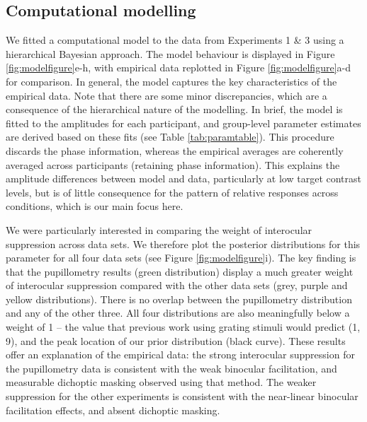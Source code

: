 \documentclass[
]{article}
\begin{document}
\hypertarget{computational-modelling}{%
\subsection{Computational modelling}\label{computational-modelling}}

We fitted a computational model to the data from Experiments 1 \& 3 using a hierarchical Bayesian approach. The model behaviour is displayed in Figure \ref{fig:modelfigure}e-h, with empirical data replotted in Figure \ref{fig:modelfigure}a-d for comparison. In general, the model captures the key characteristics of the empirical data. Note that there are some minor discrepancies, which are a consequence of the hierarchical nature of the modelling. In brief, the model is fitted to the amplitudes for each participant, and group-level parameter estimates are derived based on these fits (see Table \ref{tab:paramtable}). This procedure discards the phase information, whereas the empirical averages are coherently averaged across participants (retaining phase information). This explains the amplitude differences between model and data, particularly at low target contrast levels, but is of little consequence for the pattern of relative responses across conditions, which is our main focus here.

We were particularly interested in comparing the weight of interocular suppression across data sets. We therefore plot the posterior distributions for this parameter for all four data sets (see Figure \ref{fig:modelfigure}i). The key finding is that the pupillometry results (green distribution) display a much greater weight of interocular suppression compared with the other data sets (grey, purple and yellow distributions). There is no overlap between the pupillometry distribution and any of the other three. All four distributions are also meaningfully below a weight of 1 -- the value that previous work using grating stimuli would predict (1, 9), and the peak location of our prior distribution (black curve). These results offer an explanation of the empirical data: the strong interocular suppression for the pupillometry data is consistent with the weak binocular facilitation, and measurable dichoptic masking observed using that method. The weaker suppression for the other experiments is consistent with the near-linear binocular facilitation effects, and absent dichoptic masking.
\end{document}
